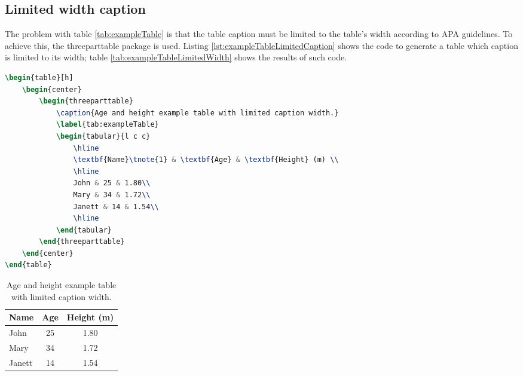 		\subsection{Limited width caption}

	The problem with table \ref{tab:exampleTable} is that the table caption must be limited to the table's width according to APA guidelines. To achieve this, the {\ttfamily threeparttable} package is used. Listing \ref{lst:exampleTableLimitedCaption} shows the code to generate a table which caption is limited to its width; table \ref{tab:exampleTableLimitedWidth} shows the results of such code.

\begin{lstlisting}[caption = {Example table with limited caption width (table \ref{tab:exampleTableLimitedCaption})}, label = {lst:exampleTableLimitedCaption}, style = prettyListing, language = tex]
\begin{table}[h]
	\begin{center}
		\begin{threeparttable}
			\caption{Age and height example table with limited caption width.}
			\label{tab:exampleTable}
			\begin{tabular}{l c c}
				\hline
				\textbf{Name}\tnote{1} & \textbf{Age} & \textbf{Height} (m) \\
				\hline
				John & 25 & 1.80\\
				Mary & 34 & 1.72\\
				Janett & 14 & 1.54\\
				\hline
			\end{tabular}
		\end{threeparttable}
	\end{center}
\end{table}
\end{lstlisting}

\begin{table}[h]
	\begin{center}
		\begin{threeparttable}
			\caption{Age and height example table with limited caption width.}
			\label{tab:exampleTableLimitedCaption}
			\begin{tabular}{l c c}
				\hline
				\textbf{Name} & \textbf{Age} & \textbf{Height} (m) \\
				\hline
				John & 25 & 1.80\\
				Mary & 34 & 1.72\\
				Janett & 14 & 1.54\\
				\hline
			\end{tabular}
		\end{threeparttable}
	\end{center}
\end{table}

